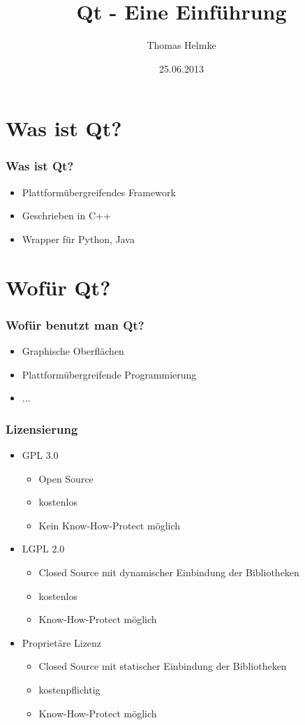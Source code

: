 \documentclass{beamer}
\title{Qt - Eine Einführung}
\author{Thomas Helmke}
\date{25.06.2013}
\begin{document}
\maketitle
\frame{\tableofcontents}
 
\section{Was ist Qt?}
\begin{frame}[<+->] %
	\frametitle{Was ist Qt?} %
	\begin{itemize}
		\item Plattformübergreifendes Framework
		\item Geschrieben in C++
		\item Wrapper für Python, Java
	\end{itemize}
\end{frame}

\section{Wofür Qt?}
\begin{frame}[<+->] %
	\frametitle{Wofür benutzt man Qt?} %
	\begin{itemize}
		\item Graphische Oberflächen
		\item Plattformübergreifende Programmierung
		\item ...
	\end{itemize}
\end{frame}
\begin{frame} %
	\frametitle{Lizensierung} %
	\begin{itemize}
		\item<1-2> GPL 3.0
			\begin{itemize}
				\item<2> Open Source
				\item<2> kostenlos
				\item<2> Kein Know-How-Protect möglich
			\end{itemize}
		\item<3-4> LGPL 2.0
			\begin{itemize}
				\item<4> Closed Source mit dynamischer Einbindung der Bibliotheken
				\item<4> kostenlos
				\item<4> Know-How-Protect möglich
			\end{itemize}
		\item<5-6> Proprietäre Lizenz
			\begin{itemize}
				\item<6> Closed Source mit statischer Einbindung der Bibliotheken
				\item<6> kostenpflichtig
				\item<6> Know-How-Protect möglich
			\end{itemize}
	\end{itemize}
\end{frame}
\end{document}
